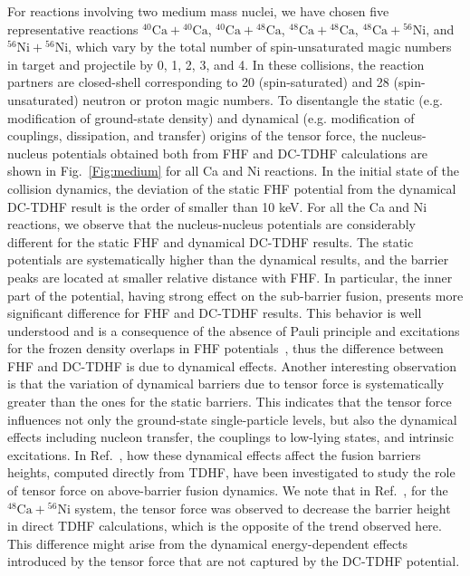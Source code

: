 For reactions involving two medium mass nuclei, we have chosen five representative reactions $^{40}\mathrm{Ca}+\mathrm{^{40}Ca}$,
$^{40}\mathrm{Ca}+\mathrm{^{48}Ca}$, $^{48}\mathrm{Ca}+\mathrm{^{48}Ca}$, $^{48}\mathrm{Ca}+\mathrm{^{56}Ni}$, and $^{56}\mathrm{Ni}+\mathrm{^{56}Ni}$,
which vary by the total number of spin-unsaturated magic numbers in target and projectile by 0, 1, 2, 3, and 4.
In these collisions, the reaction partners are closed-shell corresponding to 20 (spin-saturated) and 28 (spin-unsaturated) neutron or proton magic numbers.
To disentangle the static (e.g. modification of ground-state density) and dynamical (e.g. modification of couplings, dissipation, and transfer) origins of the tensor
force, the nucleus-nucleus potentials obtained both from FHF and DC-TDHF calculations are shown in Fig.~\ref{Fig:medium} for all Ca and Ni reactions.
In the initial state of the collision dynamics, the deviation of the static FHF potential from the dynamical DC-TDHF result is the order of smaller than 10 keV.
For all the Ca and Ni reactions, we observe that the nucleus-nucleus potentials are considerably different for the static FHF and dynamical DC-TDHF results.
The static potentials are systematically higher than the dynamical results, and the barrier peaks are located at smaller relative distance with FHF. In particular,
the inner part of the potential, having strong effect on the sub-barrier fusion, presents more significant difference for FHF and DC-TDHF results.
This behavior is well understood and is a consequence of the absence of Pauli principle and excitations for the frozen density overlaps in FHF
potentials~\citep{Simenel2013_PRC88-064604,Guo2018_PLB782-401,Simenel2017_PRC95-031601}, thus the difference between FHF and DC-TDHF is due to dynamical effects.
Another interesting observation is that the variation of dynamical barriers due to tensor force is systematically greater than the
ones for the static barriers.
This indicates that the tensor force influences not only
the ground-state single-particle levels, but also the dynamical effects including nucleon transfer, the couplings to low-lying states, and intrinsic
excitations.
In Ref.~\citep{Guo2018_PLB782-401}, how these dynamical effects affect the fusion barriers heights, computed directly from TDHF, have been investigated to study the
role of tensor force on above-barrier fusion dynamics.
We note that in Ref.~\citep{Guo2018_PLB782-401}, for the $^{48}\mathrm{Ca}+\mathrm{^{56}Ni}$ system, the
tensor force was observed to decrease the barrier height in direct TDHF calculations, which is the opposite of
the trend observed here.
This difference might arise from the dynamical energy-dependent effects introduced by the tensor force that
are not captured by the DC-TDHF potential.



